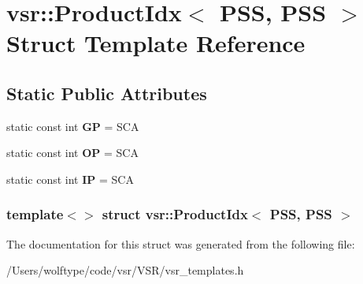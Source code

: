 \hypertarget{structvsr_1_1_product_idx_3_01_p_s_s_00_01_p_s_s_01_4}{\section{vsr\-:\-:Product\-Idx$<$ P\-S\-S, P\-S\-S $>$ Struct Template Reference}
\label{structvsr_1_1_product_idx_3_01_p_s_s_00_01_p_s_s_01_4}
}
\subsection*{Static Public Attributes}
\begin{DoxyCompactItemize}
\item 
\hypertarget{structvsr_1_1_product_idx_3_01_p_s_s_00_01_p_s_s_01_4_a0620900c2e36c7a192c4a02fd49c42a8}{static const int {\bfseries G\-P} = S\-C\-A}\label{structvsr_1_1_product_idx_3_01_p_s_s_00_01_p_s_s_01_4_a0620900c2e36c7a192c4a02fd49c42a8}

\item 
\hypertarget{structvsr_1_1_product_idx_3_01_p_s_s_00_01_p_s_s_01_4_aaf7d3dd91cc075049f7fe01824744772}{static const int {\bfseries O\-P} = S\-C\-A}\label{structvsr_1_1_product_idx_3_01_p_s_s_00_01_p_s_s_01_4_aaf7d3dd91cc075049f7fe01824744772}

\item 
\hypertarget{structvsr_1_1_product_idx_3_01_p_s_s_00_01_p_s_s_01_4_a7794db87b8d2e0373266a63bd7278358}{static const int {\bfseries I\-P} = S\-C\-A}\label{structvsr_1_1_product_idx_3_01_p_s_s_00_01_p_s_s_01_4_a7794db87b8d2e0373266a63bd7278358}

\end{DoxyCompactItemize}
\subsubsection*{template$<$$>$ struct vsr\-::\-Product\-Idx$<$ P\-S\-S, P\-S\-S $>$}



The documentation for this struct was generated from the following file\-:\begin{DoxyCompactItemize}
\item 
/\-Users/wolftype/code/vsr/\-V\-S\-R/vsr\-\_\-templates.\-h\end{DoxyCompactItemize}
